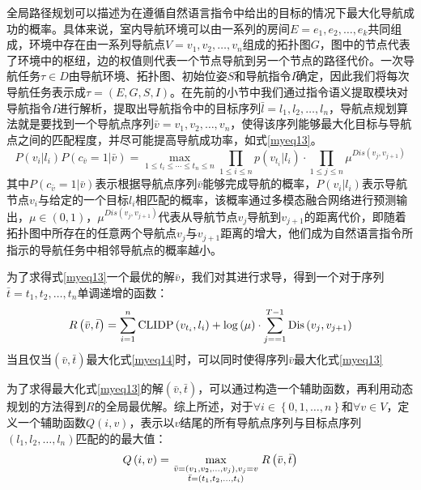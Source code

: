 全局路径规划可以描述为在遵循自然语言指令中给出的目标的情况下最大化导航成功的概率。具体来说，室内导航环境可以由一系列的房间$E = {e_1},{e_2}, \ldots ,{e_k}$共同组成，环境中存在由一系列导航点$V = {v_1},{v_2}, \ldots ,{v_n}$组成的拓扑图$G$，图中的节点代表了环境中的枢纽，边的权值则代表一个节点导航到另一个节点的路径代价。一次导航任务$\tau  \in D$由导航环境、拓扑图、初始位姿$S$和导航指令$I$确定，因此我们将每次导航任务表示成$\tau  = \left( {E,G,S,I} \right)$。在先前的小节中我们通过指令语义提取模块对导航指令$I$进行解析，提取出导航指令中的目标序列$\bar l = {l_1},{l_2}, \ldots ,{l_n}$，导航点规划算法就是要找到一个导航点序列$\bar v = {v_1},{v_2}, \ldots ,{v_n}$，使得该序列能够最大化目标与导航点之间的匹配程度，并尽可能提高导航成功率，如式\ref{myeq13}。
\begin{equation}
	P\left( {{v_i}|{l_i}} \right)P\left( {{c_{\bar v}} = 1|\bar v} \right) = \mathop {\max }\limits_{1 \le {t_i} \le  \cdots  \le {t_n} \le n} \prod\limits_{1 \le i \le n} {p\left( {{v_{{t_i}}}|{l_i}} \right) \cdot \prod\limits_{1 \le j \le n} {{\mu ^{Dis\left( {{v_j},{v_{j + 1}}} \right)}}} } 
	\label{myeq13}
\end{equation}
其中$P\left( {{c_{\bar v}} = 1|\bar v} \right)$表示根据导航点序列$\bar v$能够完成导航的概率，$P\left( {{v_i}|{l_i}} \right)$表示导航节点${v_i}$与给定的一个目标${l_i}$相匹配的概率，该概率通过多模态融合网络进行预测输出，$\mu  \in \left( {0,1} \right)$，${{\mu ^{Dis\left( {{v_j},{v_{j + 1}}} \right)}}}$代表从导航节点${{v_{j}}}$导航到${{v_{j + 1}}}$的距离代价，即随着拓扑图中所存在的任意两个导航点${v_j}$与${v_{j + 1}}$距离的增大，他们成为自然语言指令所指示的导航任务中相邻导航点的概率越小。

为了求得式\ref{myeq13}一个最优的解${\bar v}$，我们对其进行求导，得到一个对于序列$\bar t = {t_1},{t_2}, \ldots ,{t_n}$单调递增的函数：
\begin{equation}
	R\left( {\bar v,\bar t} \right) = \sum\limits_{i = 1}^n {{\rm{CLIDP}}\left( {{v_{{t_i}}},{l_i}} \right) + \log \left( \mu  \right) \cdot \sum\limits_{j =  = 1}^{T - 1} {{\rm{Dis}}\left( {{v_j},{v_{j + 1}}} \right)} } 
	\label{myeq14}
\end{equation}
当且仅当$\left( {\bar v,\bar t} \right)$最大化式\ref{myeq14}时，可以同时使得序列${\bar v}$最大化式\ref{myeq13}

为了求得最大化式\ref{myeq13}的解$\left( {\bar v,\bar t} \right)$，可以通过构造一个辅助函数，再利用动态规划的方法得到$R$的全局最优解。综上所述，对于$\forall i \in \left\{ {0,1, \ldots ,n} \right\}$和$\forall v \in V$，定义一个辅助函数$Q\left( {i,v} \right)$，表示以$v$结尾的所有导航点序列与目标点序列$\left( {{l_1},{l_2}, \ldots ,{l_n}} \right)$匹配的的最大值：
\begin{equation}
	Q\left( {i,v} \right) = \mathop {\max }\limits_{\scriptstyle\bar v = \left( {{v_1},{v_2}, \ldots ,{v_j}} \right),{v_j} = v\atop
\scriptstyle\bar t = \left( {{t_1},{t_2}, \ldots ,{t_i}} \right)} R\left( {\bar v,\bar t} \right)
	\label{myeq15}
\end{equation}


